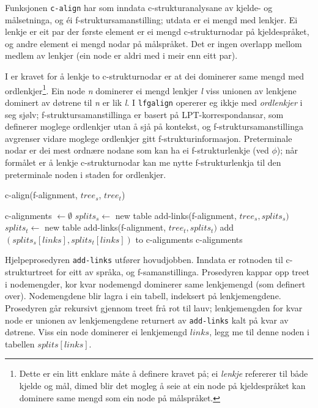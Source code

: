 \documentclass[11pt,a4paper,oneside,draft]{book}
\begin{document}
Funksjonen \texttt{c-align} har som inndata c-strukturanalysane av kjelde- og
målsetninga, og éi f-struktursamanstilling; utdata er ei mengd med
lenkjer. Ei lenkje er eit par der første element er ei mengd
c-strukturnodar på kjeldespråket, og andre element ei mengd nodar på
målspråket. Det er ingen overlapp mellom medlem av lenkjer (ein node
er aldri med i meir enn eitt par).

I \citet[s.~77]{dyvik2009lmp} er kravet for å lenkje to
c-strukturnodar er at dei dominerer same mengd med
ordlenkjer\footnote{Dette er ein litt enklare måte å definere kravet på; ei
        \emph{lenkje} refererer til både kjelde og mål, dimed blir det
        mogleg å seie at ein node på kjeldespråket kan dominere same
        mengd som ein node på målspråket. }. Ein node \emph{n} dominerer ei mengd lenkjer \emph{l} viss
unionen av lenkjene dominert av døtrene til \emph{n} er lik \emph{l}. I
\texttt{lfgalign} opererer eg ikkje med \emph{ordlenkjer} i seg sjølv;
f-struktursamanstillinga er basert på LPT-korrespondansar, som
definerer moglege ordlenkjer utan å sjå på kontekst, og
f-struktursamanstillinga avgrenser vidare moglege ordlenkjer gitt
f-strukturinformasjon. Preterminale nodar er dei mest ordnære nodane
som kan ha ei f-strukturlenkje (ved $\phi$); når formålet er å lenkje
c-strukturnodar kan me nytte f-strukturlenkja til den preterminale
noden i staden for ordlenkjer.  

 \begin{algorithm}[]
   \caption{c-align(f-alignment, $tree_s$, $tree_t$)}
   \label{algo:c-align}
    
   c-alignments $\gets \emptyset$ \;
   $splits_s \gets$ new table \;
   add-links(f-alignment, $tree_s, splits_s)$  \;
   $splits_t \gets$ new table \;
   add-links(f-alignment, $tree_t, splits_t)$  \;
    {
        {
             add $(splits_s[links],splits_t[links])$ to c-alignments \;
        }
    }
    \Return c-alignments \;
    \end{algorithm}    

Hjelpeprosedyren \texttt{add-links} utfører hovudjobben. Inndata er rotnoden
til c-strukturtreet for eitt av språka, og
f-samanstillinga. Prosedyren kappar opp treet i nodemengder, kor kvar
nodemengd dominerer same lenkjemengd (som definert over).
Nodemengdene blir lagra i ein tabell, indeksert på
lenkjemengdene. Prosedyren går rekursivt gjennom treet frå rot til
lauv; lenkjemengden for kvar node er unionen av lenkjemengdene
returnert av \texttt{add-links} kalt på kvar av døtrene. Viss ein node
dominerer ei lenkjemengd $links$, legg me til denne noden i tabellen
$splits[links]$. 
\end{document}

